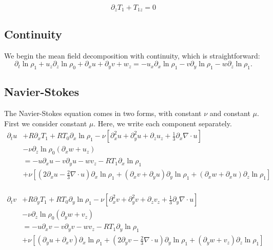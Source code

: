 \documentclass[letterpaper,12pt]{paper}
\newcommand{\lnrho}{\ensuremath{\ln \rho}}
\begin{document}
\begin{equation}
  \label{eq:aux_u}
  \partial_z T_1 + T_{1z} = 0
\end{equation}

\subsection{Continuity}
\label{sec:continuity_mfd}

We begin the mean field decomposition with continuity, which is straightforward:
\begin{equation}
  \label{eq:continuity_mfd}
  \partial_t \lnrho_1 + u_z \partial_z \lnrho_0 + \partial_x u
  + \partial_y v + w_z =
  - u_x \partial_x \lnrho_1   - v \partial_y \lnrho_1   - w \partial_z \lnrho_1.
\end{equation}

\subsection{Navier-Stokes}
\label{sec:ns_mfd}

The Navier-Stokes equation comes in two forms, with constant $\nu$ and
constant $\mu$. First we consider constant $\mu$. Here, we write each
component separately.
\begin{equation}
  \begin{aligned}
    \label{eq:ns_x_mfd}
    \partial_t u & + R \partial_x T_1 + R T_0 \partial_x \lnrho_1 - \nu
    \left[ \partial_x^2 u + \partial_y^2 u + \partial_z u_z +
      \frac{1}{3}\partial_x \nabla \cdot u \right] \\
& - \nu \partial_z \lnrho_0 \left(\partial_x w + u_z \right)  \\
    & = - u \partial_x u - v \partial_y u - w v_z - R T_1 \partial_x \lnrho_1 \\
    & + \nu \left[ \left( 2 \partial_x u - \frac{2}{3} \nabla \cdot
        u\right) \partial_x \lnrho_1 + (\partial_x v + \partial_y
      u)\partial_y \lnrho_1 + (\partial_x w + \partial_x u) \partial_z \lnrho_1 \right]\\
\end{aligned}
\end{equation}

\begin{equation}
  \begin{aligned}
    \label{eq:ns_y_mfd}
    \partial_t v & + R \partial_y T_1 + R T_0 \partial_y \lnrho_1 - \nu
    \left[ \partial_x^2 v + \partial_y^2 v + \partial_z v_z +
      \frac{1}{3} \partial_y \nabla \cdot u \right] \\
& - \nu \partial_z \lnrho_0 \left(\partial_y w + v_z \right)  \\
    & = - u \partial_x v - v \partial_y v - w v_z - R T_1 \partial_y \lnrho_1 \\
    & + \nu \left[ (\partial_y u + \partial_x
      v)\partial_x \lnrho_1 + \left( 2 \partial_y v - \frac{2}{3} \nabla \cdot
        u\right) \partial_y \lnrho_1 + (\partial_y w + v_z) \partial_z \lnrho_1 \right]\\
\end{aligned}
\end{equation}
\end{document}
